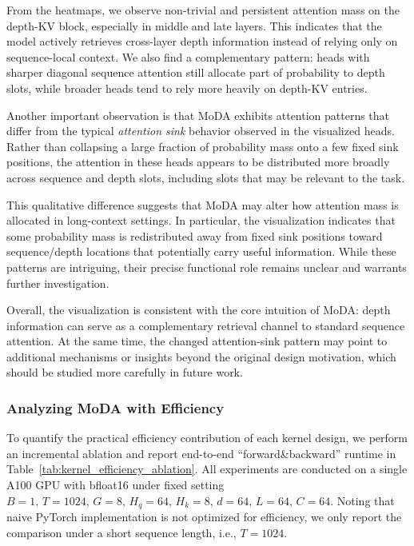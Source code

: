 \documentclass[]{bytedance_seed}
\newcommand{\name}{MoDA}
\begin{document}
From the heatmaps, we observe non-trivial and persistent attention mass on the depth-KV block, especially in middle and late layers.
This indicates that the model actively retrieves cross-layer depth information instead of relying only on sequence-local context.
We also find a complementary pattern: heads with sharper diagonal sequence attention still allocate part of probability to depth slots, while broader heads tend to rely more heavily on depth-KV entries.

Another important observation is that \name{} exhibits attention patterns that differ from the typical \emph{attention sink} behavior observed in the visualized heads.
Rather than collapsing a large fraction of probability mass onto a few fixed sink positions, the attention in these heads appears to be distributed more broadly across sequence and depth slots, including slots that may be relevant to the task.

This qualitative difference suggests that \name{} may alter how attention mass is allocated in long-context settings.
In particular, the visualization indicates that some probability mass is redistributed away from fixed sink positions toward sequence/depth locations that potentially carry useful information.
While these patterns are intriguing, their precise functional role remains unclear and warrants further investigation.

Overall, the visualization is consistent with the core intuition of \name{}:
depth information can serve as a complementary retrieval channel to standard sequence attention.
At the same time, the changed attention-sink pattern may point to additional mechanisms or insights beyond the original design motivation, which should be studied more carefully in future work.

\subsubsection{Analyzing \name{} with Efficiency}

To quantify the practical efficiency contribution of each kernel design, we perform an incremental ablation and report end-to-end ``forward\&backward'' runtime in Table~\ref{tab:kernel_efficiency_ablation}.
All experiments are conducted on a single A100 GPU with bfloat16 under fixed setting $B{=}1,\,T{=}1024,\,G{=}8,\,H_q{=}64,\,H_k{=}8,\,d{=}64,\,L{=}64,\,C{=}64$.
Noting that naive PyTorch implementation is not optimized for efficiency, we only report the comparison under a short sequence length, i.e., $T{=}1024$.
\end{document}
